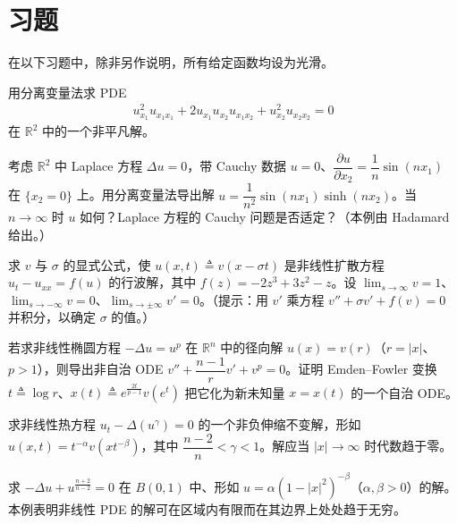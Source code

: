 \documentclass[../../main.tex]{subfiles}
\begin{document}
\section{习题}\label{section:ch04-exercises}

在以下习题中，除非另作说明，所有给定函数均设为光滑。

\begin{exercise}\label{exercise:ch04-01}
用分离变量法求 PDE
\begin{align*}
u_{x_1}^2u_{x_1x_1}+2u_{x_1}u_{x_2}u_{x_1x_2}+u_{x_2}^2u_{x_2x_2}=0
\end{align*}
在 $\mathbb{R}^2$ 中的一个非平凡解。
\end{exercise}

\begin{exercise}\label{exercise:ch04-02}
考虑 $\mathbb{R}^2$ 中 Laplace 方程 $\Delta u=0$，带 Cauchy 数据 $u=0$、$\dfrac{\partial u}{\partial x_2}=\dfrac{1}{n}\sin(nx_1)$ 在 $\{x_2=0\}$ 上。用分离变量法导出解 $u=\dfrac{1}{n^2}\sin(nx_1)\sinh(nx_2)$。当 $n\to\infty$ 时 $u$ 如何？Laplace 方程的 Cauchy 问题是否适定？（本例由 Hadamard 给出。）
\end{exercise}

\begin{exercise}\label{exercise:ch04-03}
求 $v$ 与 $\sigma$ 的显式公式，使 $u(x,t)\triangleq v(x-\sigma t)$ 是非线性扩散方程 $u_t-u_{xx}=f(u)$ 的行波解，其中 $f(z)=-2z^3+3z^2-z$。设 $\lim_{s\to\infty}v=1$、$\lim_{s\to-\infty}v=0$、$\lim_{s\to\pm\infty}v'=0$。（提示：用 $v'$ 乘方程 $v''+\sigma v'+f(v)=0$ 并积分，以确定 $\sigma$ 的值。）
\end{exercise}

\begin{exercise}\label{exercise:ch04-04}
若求非线性椭圆方程 $-\Delta u=u^p$ 在 $\mathbb{R}^n$ 中的径向解 $u(x)=v(r)$（$r=|x|$、$p>1$），则导出非自治 ODE $v''+\dfrac{n-1}{r}v'+v^p=0$。证明 Emden--Fowler 变换 $t\triangleq\log r$、$x(t)\triangleq e^{\frac{2t}{p-1}}v(e^t)$ 把它化为新未知量 $x=x(t)$ 的一个自治 ODE。
\end{exercise}

\begin{exercise}\label{exercise:ch04-05}
求非线性热方程 $u_t-\Delta(u^\gamma)=0$ 的一个非负伸缩不变解，形如 $u(x,t)=t^{-\alpha}v(xt^{-\beta})$，其中 $\dfrac{n-2}{n}<\gamma<1$。解应当 $|x|\to\infty$ 时代数趋于零。
\end{exercise}

\begin{exercise}\label{exercise:ch04-06}
求 $-\Delta u+u^{\frac{n+2}{n-2}}=0$ 在 $B(0,1)$ 中、形如 $u=\alpha(1-|x|^2)^{-\beta}$（$\alpha,\beta>0$）的解。本例表明非线性 PDE 的解可在区域内有限而在其边界上处处趋于无穷。
\end{exercise}
\end{document}
